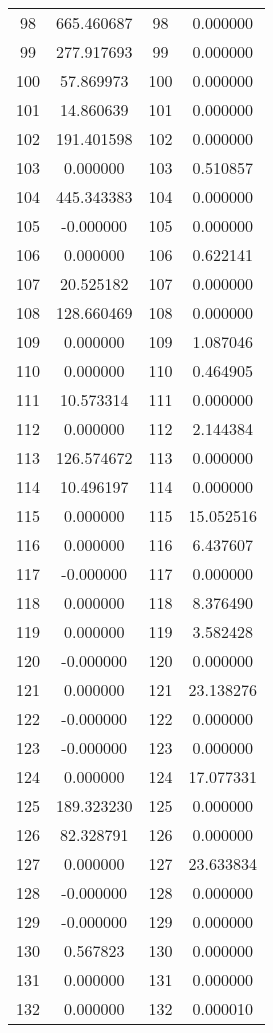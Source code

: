 \documentclass[12pt]{article}
\begin{document}
\begin{longtable}{@{}cccc@{}}
98 & 665.460687 & 98 & 0.000000 \\
99 & 277.917693 & 99 & 0.000000 \\
100 & 57.869973 & 100 & 0.000000 \\
101 & 14.860639 & 101 & 0.000000 \\
102 & 191.401598 & 102 & 0.000000 \\
103 & 0.000000 & 103 & 0.510857 \\
104 & 445.343383 & 104 & 0.000000 \\
105 & -0.000000 & 105 & 0.000000 \\
106 & 0.000000 & 106 & 0.622141 \\
107 & 20.525182 & 107 & 0.000000 \\
108 & 128.660469 & 108 & 0.000000 \\
109 & 0.000000 & 109 & 1.087046 \\
110 & 0.000000 & 110 & 0.464905 \\
111 & 10.573314 & 111 & 0.000000 \\
112 & 0.000000 & 112 & 2.144384 \\
113 & 126.574672 & 113 & 0.000000 \\
114 & 10.496197 & 114 & 0.000000 \\
115 & 0.000000 & 115 & 15.052516 \\
116 & 0.000000 & 116 & 6.437607 \\
117 & -0.000000 & 117 & 0.000000 \\
118 & 0.000000 & 118 & 8.376490 \\
119 & 0.000000 & 119 & 3.582428 \\
120 & -0.000000 & 120 & 0.000000 \\
121 & 0.000000 & 121 & 23.138276 \\
122 & -0.000000 & 122 & 0.000000 \\
123 & -0.000000 & 123 & 0.000000 \\
124 & 0.000000 & 124 & 17.077331 \\
125 & 189.323230 & 125 & 0.000000 \\
126 & 82.328791 & 126 & 0.000000 \\
127 & 0.000000 & 127 & 23.633834 \\
128 & -0.000000 & 128 & 0.000000 \\
129 & -0.000000 & 129 & 0.000000 \\
130 & 0.567823 & 130 & 0.000000 \\
131 & 0.000000 & 131 & 0.000000 \\
132 & 0.000000 & 132 & 0.000010 \\

\end{longtable}
\end{document}
